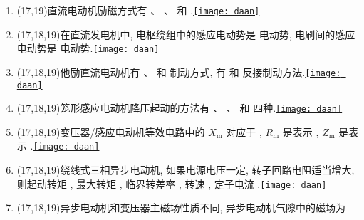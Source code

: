 \documentclass[lang=cn,11pt,marginpar=margintrue]{elegantbook}%
\newcommand{\daan}[1]{\hfill\hyperref[#1]{\texttt{[image: daan]}}}
\newcommand{\xiahua}[1]{ \underline{\hspace{#1 pc}} }
\begin{document}
\begin{enumerate}
	\item (17,19)直流电动机励磁方式有\xiahua{3.5}、\xiahua{3.5}、\xiahua{3.5}和\xiahua{3.5}.\daan{tk:1}
	\item (17,18,19)在直流发电机中, 电枢绕组中的感应电动势是\xiahua{4}电动势, 电刷间的感应电动势是\xiahua{4}电动势.\daan{tk:2}
	\item (17,18,19)他励直流电动机有\xiahua{4}、\xiahua{4}和\xiahua{4}制动方式, 有\xiahua{4}和\xiahua{4}反接制动方法.\daan{tk:3}
	\item (17,18,19)笼形感应电动机降压起动的方法有\xiahua{4}、\xiahua{4}、\xiahua{4}和\xiahua{4}四种.\daan{tk:4}
	\item (17,18,19)变压器/感应电动机等效电路中的 $X_{\mathrm{m}}$ 对应于\xiahua{3}, $R_{\mathrm{m}}$ 是表示\xiahua{3}, $Z_{\mathrm{m}}$ 是表示\xiahua{3}.\daan{tk:5}
	\item (17,18,19)绕线式三相异步电动机, 如果电源电压一定, 转子回路电阻适当增大, 则起动转矩\xiahua{4}, 最大转矩\xiahua{4}, 临界转差率\xiahua{4}, 转速\xiahua{4}, 定子电流\xiahua{4}.\daan{tk:6}
	\item (17,18,19)异步电动机和变压器主磁场性质不同, 异步电动机气隙中的磁场为
	

\end{enumerate}
\end{document}
